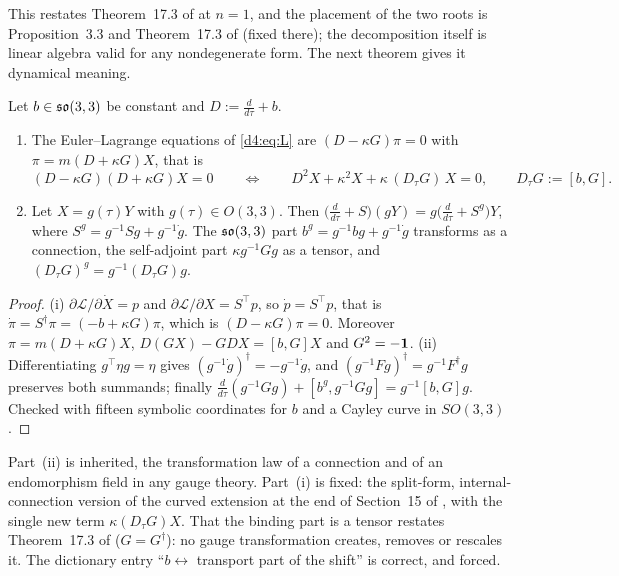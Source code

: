 This restates Theorem~17.3 of \cite{ES17} at $n=1$, and the placement of the two roots is Proposition~3.3 and Theorem~17.3 of \cite{ES17}
(fixed there); the decomposition itself is linear algebra valid for any nondegenerate form. The next theorem gives it dynamical meaning.

\begin{theorem}
\label{d4:thm:covariant}
Let $b\in\mathfrak{so}(3,3)$ be constant and $D:=\frac{d}{d\tau}+b$.
\begin{enumerate}[label=(\roman*),leftmargin=2.2em]
\item The Euler--Lagrange equations of \eqref{d4:eq:L} are $(D-\kappa G)\pi=0$ with $\pi=m(D+\kappa G)X$, that is
\begin{equation}
\label{d4:eq:covEL}
(D-\kappa G)(D+\kappa G)X=0\qquad\Longleftrightarrow\qquad D^2X+\kappa^2X+\kappa\,(D_\tau G)\,X=0,\qquad D_\tau G:=[b,G].
\end{equation}
\item Let $X=g(\tau)Y$ with $g(\tau)\in O(3,3)$. Then $\bigl(\tfrac d{d\tau}+S\bigr)(gY)=g\bigl(\tfrac d{d\tau}+S^g\bigr)Y$, where $S^g=g^{-1}Sg+g^{-1}\dot g$. The
$\mathfrak{so}(3,3)$ part $b^g=g^{-1}bg+g^{-1}\dot g$ transforms as a connection, the self-adjoint part $\kappa g^{-1}Gg$ as a tensor, and
$(D_\tau G)^g=g^{-1}(D_\tau G)g$.
\end{enumerate}
\end{theorem}

\begin{proof}
(i) $\partial\mathcal L/\partial\dot X=p$ and $\partial\mathcal L/\partial X=S^{\!\top}p$, so $\dot p=S^{\!\top}p$, that is
$\dot\pi=S^\dagger\pi=(-b+\kappa G)\pi$, which is $(D-\kappa G)\pi=0$. Moreover $\pi=m(D+\kappa G)X$, $D(GX)-GDX=[b,G]X$ and $G^2=-\mathbf 1$.
(ii) Differentiating $g^{\!\top}\eta g=\eta$ gives $(g^{-1}\dot g)^\dagger=-g^{-1}\dot g$, and $(g^{-1}Fg)^\dagger=g^{-1}F^\dagger g$ preserves both summands;
finally $\frac d{d\tau}(g^{-1}Gg)+[b^g,g^{-1}Gg]=g^{-1}[b,G]g$. Checked with fifteen symbolic coordinates for $b$ and a Cayley curve in $SO(3,3)$.
\end{proof}

Part~(ii) is inherited, the transformation law of a connection and of an endomorphism field in any gauge theory. Part~(i) is fixed: the
split-form, internal-connection version of the curved extension at the end of Section~15 of \cite{ES17}, with the single new term
$\kappa(D_\tau G)X$. That the binding part is a tensor restates Theorem~17.3 of \cite{ES17} ($G=G^\dagger$): no gauge transformation creates,
removes or rescales it. The dictionary entry ``$b\leftrightarrow$ transport part of the shift'' is correct, and forced.

